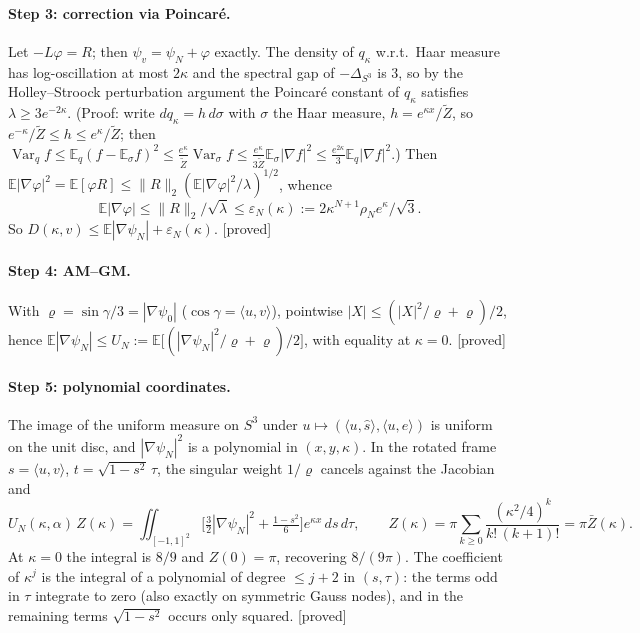 \documentclass[11pt,a4paper]{article}
\theoremstyle{remark}
\theoremstyle{definition}
\theoremstyle{plain}
\theoremstyle{remark}
\newcommand{\E}{\mathbb{E}}
\newcommand{\st}[1]{\textsf{[#1]}}
\newcommand{\Zb}{\bar Z}
\begin{document}
\paragraph{Step 3: correction via Poincar\'e.} Let $-L\varphi=R$; then $\psi_v=\psi_N+\varphi$ exactly. The
density of $q_\kappa$ w.r.t.\ Haar measure has log-oscillation at most $2\kappa$ and the spectral gap of
$-\Delta_{S^3}$ is $3$, so by the Holley--Stroock perturbation argument \cite{HS87} the Poincar\'e constant
of $q_\kappa$ satisfies $\lambda\ge3e^{-2\kappa}$. (Proof: write $dq_\kappa=h\,d\sigma$ with $\sigma$ the
Haar measure, $h=e^{\kappa x}/\tilde Z$, so $e^{-\kappa}/\tilde Z\le h\le e^{\kappa}/\tilde Z$; then
$\operatorname{Var}_{q}f\le\E_q(f-\E_\sigma f)^2\le\frac{e^{\kappa}}{\tilde Z}\operatorname{Var}_\sigma f
\le\frac{e^{\kappa}}{3\tilde Z}\E_\sigma|\nabla f|^2\le\frac{e^{2\kappa}}{3}\E_q|\nabla f|^2$.) Then
$\E|\nabla\varphi|^2=\E[\varphi R]\le\|R\|_2(\E|\nabla\varphi|^2/\lambda)^{1/2}$, whence
\[
\E|\nabla\varphi|\le\|R\|_2/\sqrt\lambda\le\varepsilon_N(\kappa):=2\kappa^{N+1}\rho_N e^{\kappa}/\sqrt3 .
\]
So $D(\kappa,v)\le\E|\nabla\psi_N|+\varepsilon_N(\kappa)$. \st{proved}

\paragraph{Step 4: AM--GM.} With $\varrho=\sin\gamma/3=|\nabla\psi_0|$ ($\cos\gamma=\langle u,v\rangle$),
pointwise $|X|\le(|X|^2/\varrho+\varrho)/2$, hence
$\E|\nabla\psi_N|\le U_N:=\E\big[(|\nabla\psi_N|^2/\varrho+\varrho)/2\big]$, with equality at $\kappa=0$. \st{proved}

\paragraph{Step 5: polynomial coordinates.} The image of the uniform measure on $S^3$ under
$u\mapsto(\langle u,\hat s\rangle,\langle u,e\rangle)$ is uniform on the unit disc, and $|\nabla\psi_N|^2$ is a
polynomial in $(x,y,\kappa)$. In the rotated frame $s=\langle u,v\rangle$, $t=\sqrt{1-s^2}\,\tau$, the singular
weight $1/\varrho$ cancels against the Jacobian and
\[
U_N(\kappa,\alpha)\,Z(\kappa)=\iint_{[-1,1]^2}\Big[\tfrac32|\nabla\psi_N|^2+\tfrac{1-s^2}{6}\Big]e^{\kappa x}\,ds\,d\tau,
\qquad Z(\kappa)=\pi\sum_{k\ge0}\frac{(\kappa^2/4)^k}{k!\,(k+1)!}=\pi\Zb(\kappa).
\]
At $\kappa=0$ the integral is $8/9$ and $Z(0)=\pi$, recovering $8/(9\pi)$. The coefficient of $\kappa^j$ is the
integral of a polynomial of degree $\le j+2$ in $(s,\tau)$: the terms odd in $\tau$ integrate to zero
(also exactly on symmetric Gauss nodes), and in the remaining terms $\sqrt{1-s^2}$ occurs only squared.
\st{proved}
\end{document}
